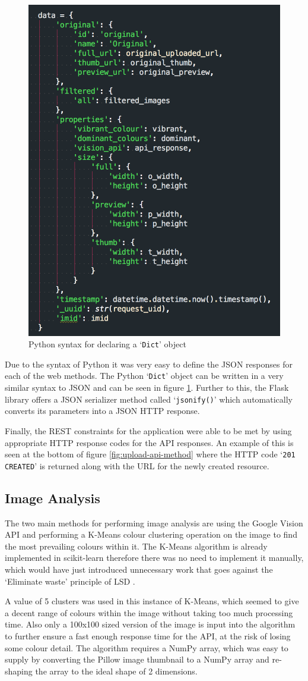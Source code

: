 \documentclass[a4paper,12pt]{report}
\begin{document}
      \begin{figure}[h]
        \centering
        \includegraphics[width=0.4\linewidth]{python-json-dict}
        \caption{Python syntax for declaring a ‘\texttt{Dict}’ object}
        \label{fig:python-json-dict}
      \end{figure}

      Due to the syntax of Python it was very easy to define the JSON responses for each of the web methods. The Python ‘\texttt{Dict}’ object can be written in a very similar syntax to JSON and can be seen in figure \ref{fig:python-json-dict}. Further to this, the Flask library offers a JSON serializer method called ‘\texttt{jsonify()}’ which automatically converts its parameters into a JSON HTTP response.

      Finally, the REST constraints for the application were able to be met by using appropriate HTTP response codes for the API responses. An example of this is seen at the bottom of figure \ref{fig:upload-api-method} where the HTTP code ‘\texttt{201 CREATED}’ is returned along with the URL for the newly created resource.

    \subsection{Image Analysis}
      The two main methods for performing image analysis are using the Google Vision API and performing a K-Means colour clustering operation on the image to find the most prevailing colours within it. The K-Means algorithm is already implemented in scikit-learn therefore there was no need to implement it manually, which would have just introduced unnecessary work that goes against the ‘Eliminate waste’ principle of LSD \citep{poppendieck2003lean}.

      A value of 5 clusters was used in this instance of K-Means, which seemed to give a decent range of colours within the image without taking too much processing time. Also only a 100x100 sized version of the image is input into the algorithm to further ensure a fast enough response time for the API, at the risk of losing some colour detail. The algorithm requires a NumPy array, which was easy to supply by converting the Pillow image thumbnail to a NumPy array and re-shaping the array to the ideal shape of 2 dimensions.
\end{document}

